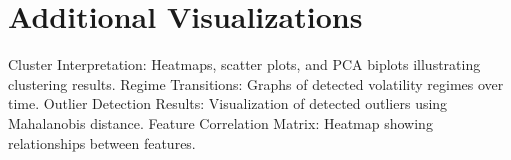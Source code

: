 \chapter{Additional Visualizations}

Cluster Interpretation: Heatmaps, scatter plots, and PCA biplots illustrating clustering results.
Regime Transitions: Graphs of detected volatility regimes over time.
Outlier Detection Results: Visualization of detected outliers using Mahalanobis distance.
Feature Correlation Matrix: Heatmap showing relationships between features.
